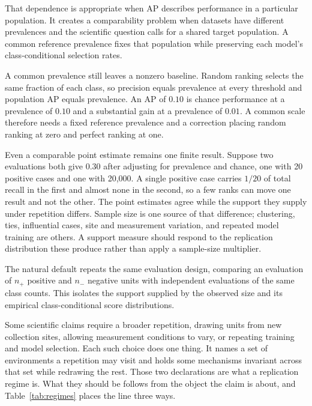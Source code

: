 \documentclass[11pt]{article}
\theoremstyle{remark}
\begin{document}
That dependence is appropriate when AP describes performance in a particular population. It creates a comparability problem when datasets have different prevalences and the scientific question calls for a shared target population. A common reference prevalence fixes that population while preserving each model's class-conditional selection rates.

A common prevalence still leaves a nonzero baseline. Random ranking selects the same fraction of each class, so precision equals prevalence at every threshold and population AP equals prevalence. An AP of $0.10$ is chance performance at a prevalence of $0.10$ and a substantial gain at a prevalence of $0.01$. A common scale therefore needs a fixed reference prevalence and a correction placing random ranking at zero and perfect ranking at one.

Even a comparable point estimate remains one finite result. Suppose two evaluations both give $0.30$ after adjusting for prevalence and chance, one with 20 positive cases and one with 20,000. A single positive case carries $1/20$ of total recall in the first and almost none in the second, so a few ranks can move one result and not the other. The point estimates agree while the support they supply under repetition differs. Sample size is one source of that difference; clustering, ties, influential cases, site and measurement variation, and repeated model training are others. A support measure should respond to the replication distribution these produce rather than apply a sample-size multiplier.

The natural default repeats the same evaluation design, comparing an evaluation of $n_+$ positive and $n_-$ negative units with independent evaluations of the same class counts. This isolates the support supplied by the observed size and its empirical class-conditional score distributions.

Some scientific claims require a broader repetition, drawing units from new collection sites, allowing measurement conditions to vary, or repeating training and model selection. Each such choice does one thing. It names a set of environments a repetition may visit and holds some mechanisms invariant across that set while redrawing the rest. Those two declarations are what a replication regime is. What they should be follows from the object the claim is about, and Table~\ref{tab:regimes} places the line three ways.
\end{document}
